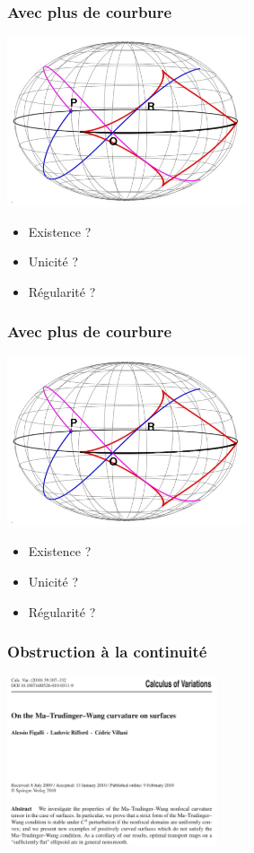 \documentclass[9pt]{beamer}
\begin{document}
\begin{frame}
\frametitle{\bf Avec plus de courbure}
 
\centering \includegraphics[height=5.0cm]{ellip}

\begin{itemize}
  \item Existence ?
  \item Unicit\'e ?
  \item R\'egularit\'e ?
\end{itemize}

\end{frame}

\begin{frame}
\frametitle{\bf Avec plus de courbure}
 
\centering \includegraphics[height=5.0cm]{ellip}

\begin{itemize}
  \item Existence ?
  \item Unicit\'e ?
  \item R\'egularit\'e ?
\end{itemize}

\end{frame}

\begin{frame}
\frametitle{\bf Obstruction \`a la continuit\'e}
 
\centering \includegraphics[height=5.0cm]{figal1}

\end{frame}
\end{document}
